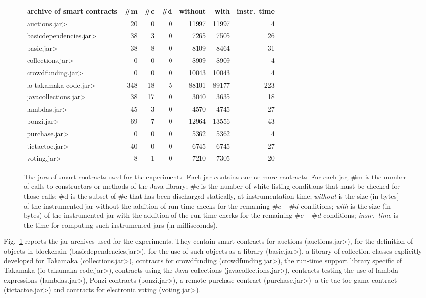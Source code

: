 \begin{figure}[t]
  \begin{center}
\begin{tabular}{|l||r|r|r||r|r||r|}
  \hline
  archive of smart contracts & \#m & \#c & \#d & without & with & instr.\ time \\\hline\hline
  \<auctions.jar> & 20 & 0 & 0 & 11997 & 11997 & 4 \\\hline
  \<basicdependencies.jar> & 38 & 3 & 0 & 7265 & 7505 & 26 \\\hline
  \<basic.jar> & 38 & 8 & 0 & 8109 & 8464 & 31 \\\hline
  \<collections.jar> & 0 & 0 & 0 & 8909 & 8909 & 4 \\\hline
  \<crowdfunding.jar> & 0 & 0 & 0 & 10043 & 10043 & 4 \\\hline
  \<io-takamaka-code.jar> & 348 & 18 & 5 & 88101 & 89177 & 223 \\\hline
  \<javacollections.jar> & 38 & 17 & 0 & 3040 & 3635 & 18 \\\hline
  \<lambdas.jar> & 45 & 3 & 0 & 4570 & 4745 & 27 \\\hline
  \<ponzi.jar> & 69 & 7 & 0 & 12964 & 13556 & 43 \\\hline
  \<purchase.jar> & 0 & 0 & 0 & 5362 & 5362 & 4 \\\hline
  \<tictactoe.jar> & 40 & 0 & 0 & 6745 & 6745 & 27 \\\hline
  \<voting.jar> & 8 & 1 & 0 & 7210 & 7305 & 20 \\\hline
\end{tabular}
  \end{center}
  \caption{The jars of smart contracts used for the experiments. Each jar
    contains one or more contracts. For each jar, \#m is the number
    of calls to constructors or methods of the Java library;
    \#c is the number of white-listing conditions that must be checked
    for those calls; \#d is the subset of \#c that has been discharged
    statically, at instrumentation time; \emph{without} is the size
    (in bytes) of the instrumented jar without the addition of run-time checks
    for the remaining $\#c - \#d$ conditions; \emph{with}
    is the size (in bytes) of the instrumented jar with the addition of the
    run-time checks for the remaining $\#c - \#d$ conditions;
    \emph{instr.\ time} is the time for computing such instrumented jars (in milliseconds).}
  \label{fig:experiments}
  \end{figure}

Fig.~\ref{fig:experiments} reports the jar archives used for the experiments.
They contain smart contracts for auctions (\<auctions.jar>), for the definition
of objects in blockchain (\<basicdependencies.jar>), for the use of such objects
as a library (\<basic.jar>), a library of collection classes explicitly developed
for Takamaka (\<collections.jar>), contracts for crowdfunding (\<crowdfunding.jar>),
the run-time support library specific of Takamaka (\<io-takamaka-code.jar>),
contracts using the Java collections (\<javacollections.jar>), contracts
testing the use of lambda expressions (\<lambdas.jar>), Ponzi contracts
(\<ponzi.jar>), a remote purchase contract (\<purchase.jar>), a tic-tac-toe
game contract (\<tictactoe.jar>) and contracts for electronic voting (\<voting.jar>).

